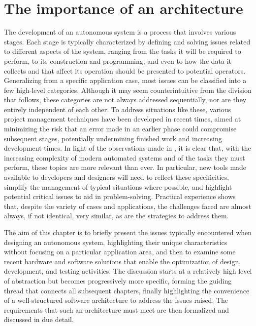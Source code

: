 \chapter{The importance of an architecture}
\label{ch:prb}
\doublespacing
\vspace{-2.5cm}

The development of an autonomous system is a process that involves various stages. Each stage is typically characterized by defining and solving issues related to different aspects of the system, ranging from the tasks it will be required to perform, to its construction and programming, and even to how the data it collects and that affect its operation should be presented to potential operators. Generalizing from a specific application case, most issues can be classified into a few high-level categories. Although it may seem counterintuitive from the division that follows, these categories are not always addressed sequentially, nor are they entirely independent of each other. To address situations like these, various project management techniques have been developed in recent times, aimed at minimizing the risk that an error made in an earlier phase could compromise subsequent stages, potentially undermining finished work and increasing development times. In light of the observations made in , it is clear that, with the increasing complexity of modern automated systems and of the tasks they must perform, these topics are more relevant than ever. In particular, new tools made available to developers and designers will need to reflect these specificities, simplify the management of typical situations where possible, and highlight potential critical issues to aid in problem-solving. Practical experience shows that, despite the variety of cases and applications, the challenges faced are almost always, if not identical, very similar, as are the strategies to address them.

The aim of this chapter is to briefly present the issues typically encountered when designing an autonomous system, highlighting their unique characteristics without focusing on a particular application area, and then to examine some recent hardware and software solutions that enable the optimization of design, development, and testing activities. The discussion starts at a relatively high level of abstraction but becomes progressively more specific, forming the guiding thread that connects all subsequent chapters, finally highlighting the convenience of a well-structured software architecture to address the issues raised. The requirements that such an architecture must meet are then formalized and discussed in due detail.

